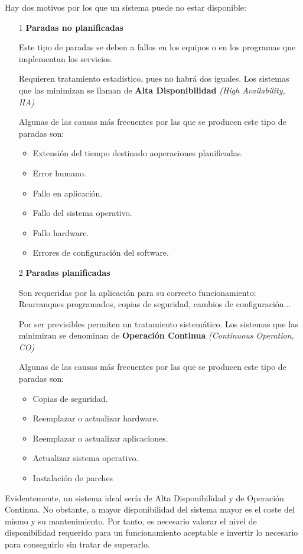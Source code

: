 \documentclass{apuntes}[nochap]
\begin{document}
Hay dos motivos por los que un sistema puede no estar disponible:
\begin{enumerate}
\item[1] \textbf{Paradas no planificadas}

Este tipo de paradas se deben a fallos en los equipos o en los programas que implementan los servicios.

Requieren tratamiento estadístico, pues no habrá dos iguales. Los sistemas que las minimizan se llaman de \textbf{Alta Disponibilidad} \textit{(High Availability, HA)}


Algunas de las causas más frecuentes por las que se producen este tipo de paradas son:

\begin{itemize}
\item Extensión del tiempo destinado aoperaciones planificadas.
\item Error humano.
\item Fallo en aplicación.
\item Fallo del sistema operativo.
\item Fallo hardware.
\item Errores de configuración del software.
\end{itemize}

\item[2] \textbf{Paradas planificadas}

Son requeridas por la aplicación para su correcto funcionamiento: Rearranques programados, copias de seguridad, cambios de configuración...

Por ser previsibles permiten un tratamiento sistemático. Los sistemas que las minimizan se denominan de \textbf{Operación Continua} \textit{(Continuous Operation, CO)}

Algunas de las causas más frecuentes por las que se producen este tipo de paradas son:

\begin{itemize}
\item Copias de seguridad.
\item Reemplazar o actualizar hardware.
\item Reemplazar o actualizar aplicaciones.
\item Actualizar sistema operativo.
\item Instalación de parches
\end{itemize}
\end{enumerate}

Evidentemente, un sistema ideal sería de Alta Disponibilidad y de Operación Continua. No obstante, a mayor disponibilidad del sistema mayor es el coste del mismo y su mantenimiento. Por tanto, es necesario valorar el nivel de disponibilidad requerido para un funcionamiento aceptable e invertir lo necesario para conseguirlo sin tratar de superarlo.
\end{document}
